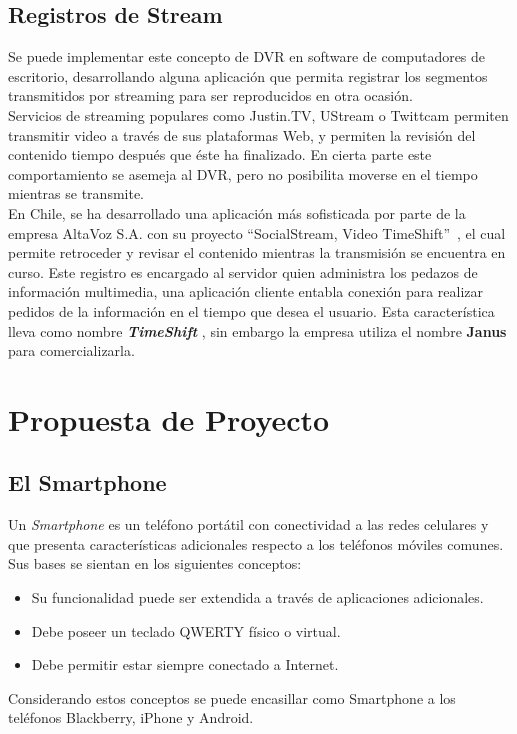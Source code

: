 \subsection{Registros de Stream}

Se puede implementar este concepto de DVR en software de computadores de escritorio, desarrollando alguna aplicación que permita registrar los segmentos transmitidos por streaming para ser reproducidos en otra ocasión. \\

	Servicios de streaming populares como Justin.TV, UStream o Twittcam permiten transmitir video a través de sus plataformas Web, y permiten la revisión del contenido tiempo después que éste ha finalizado. En cierta parte este comportamiento se asemeja al DVR, pero no posibilita moverse en el tiempo mientras se transmite.\\

En Chile, se ha desarrollado una aplicación más sofisticada por parte de la empresa AltaVoz S.A. con su proyecto \textquotedblleft SocialStream, Video TimeShift\textquotedblright \ , el cual permite retroceder y revisar el contenido mientras la transmisión se encuentra en curso. Este registro es encargado al servidor quien administra los pedazos de información multimedia, una aplicación cliente entabla conexión para realizar pedidos de la información en el tiempo que desea el usuario.
Esta característica lleva como nombre \textbf{\textit{TimeShift}} \cite{cap1:time-shift}, sin embargo la empresa utiliza el nombre \textbf{Janus} \cite{cap1:altavoz-janus} para comercializarla.

\clearpage
\section{Propuesta de Proyecto}
\subsection{El Smartphone}
Un \textit{Smartphone} es un teléfono portátil con conectividad a las redes celulares y que presenta características adicionales respecto a los teléfonos móviles comunes.\\

Sus bases se sientan en los siguientes conceptos:
\begin{itemize}
\item Su funcionalidad puede ser extendida a través de aplicaciones adicionales.
\item Debe poseer un teclado QWERTY físico o virtual.
\item Debe permitir estar siempre conectado a Internet.
\end{itemize}
Considerando estos conceptos se puede encasillar como Smartphone a los teléfonos Blackberry, iPhone y Android.

